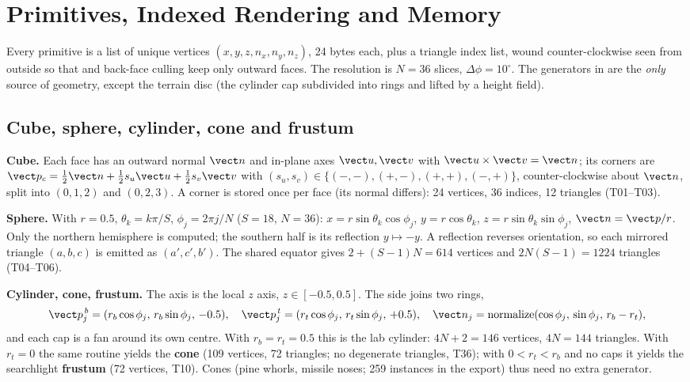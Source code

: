 \section{Primitives, Indexed Rendering and Memory}\label{sec:prims}
Every primitive is a list of unique vertices $(x,y,z,n_x,n_y,n_z)$, 24 bytes each, plus a triangle index list, wound counter-clockwise seen from outside so that  and back-face culling keep only outward faces. The resolution is $N=36$ slices, $\Delta\phi=10^\circ$. The generators in  are the \emph{only} source of geometry, except the terrain disc (the cylinder cap subdivided into rings and lifted by a height field).

\subsection{Cube, sphere, cylinder, cone and frustum}
\textbf{Cube.} Each face has an outward normal $\vect n$ and in-plane axes $\vect u,\vect v$ with
$\vect u\times\vect v=\vect n$; its corners are
$\vect p_c=\tfrac12\vect n+\tfrac12 s_u\vect u+\tfrac12 s_v\vect v$ with
$(s_u,s_v)\in\{(-,-),(+,-),(+,+),(-,+)\}$, counter-clockwise about $\vect n$, split into $(0,1,2)$ and
$(0,2,3)$. A corner is stored once per face (its normal differs): 24 vertices, 36 indices, 12 triangles (T01--T03).

\textbf{Sphere.} With $r=0.5$, $\theta_k=k\pi/S$, $\phi_j=2\pi j/N$ ($S=18$, $N=36$):
$x=r\sin\theta_k\cos\phi_j$, $y=r\cos\theta_k$, $z=r\sin\theta_k\sin\phi_j$, $\vect n=\vect p/r$. Only the
northern hemisphere is computed; the southern half is its reflection $y\mapsto-y$. A reflection reverses orientation, so each mirrored triangle
$(a,b,c)$ is emitted as $(a',c',b')$. The shared equator gives $2+(S-1)N=614$ vertices and $2N(S-1)=1224$
triangles (T04--T06).

\textbf{Cylinder, cone, frustum.} The axis is the local $z$ axis, $z\in[-0.5,0.5]$. The side joins two rings,
\begin{equation}
  \vect p^{\,b}_j=(r_b\cos\phi_j,\,r_b\sin\phi_j,\,-0.5),\quad
  \vect p^{\,t}_j=(r_t\cos\phi_j,\,r_t\sin\phi_j,\,+0.5),\quad
  \vect n_j=\mathrm{normalize}(\cos\phi_j,\,\sin\phi_j,\,r_b-r_t),
\end{equation}
and each cap is a fan around its own centre. With $r_b=r_t=0.5$ this is the lab cylinder: $4N+2=146$ vertices,
$4N=144$ triangles. With $r_t=0$ the same routine yields the \textbf{cone} (109 vertices, 72 triangles; no degenerate triangles, T36); with $0<r_t<r_b$ and no caps it yields the
searchlight \textbf{frustum} (72 vertices, T10). Cones (pine whorls, missile noses; 259 instances in the export) thus need no extra generator.

